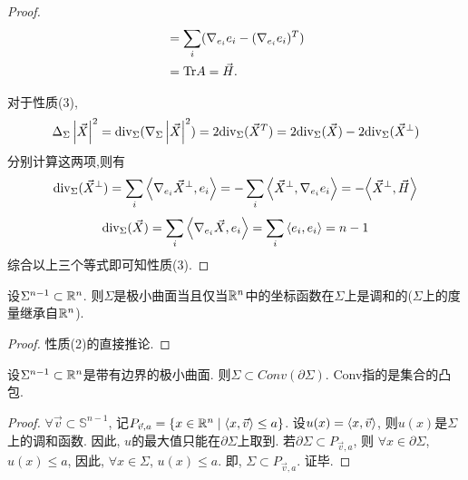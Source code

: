 \begin{proof}
\begin{equation}
\begin{split}
            &= \sum_i(\nabla_{e_i}e_i - (\nabla_{e_i}e_i)^T )\\
            &= \text{Tr} A = \vec{H}.
        \end{split}
    \end{equation}
    \par 对于性质(3),
    \begin{equation}
        \Delta_\Sigma\left | {\vec{X}} \right |^2={\text{div}}_\Sigma(\nabla_\Sigma\left | {\vec{X}} \right |^2) = 2{\text{div}}_\Sigma({\vec{X}}^T)=2{\text{div}}_\Sigma({\vec{X}})-2{\text{div}}_\Sigma({\vec{X}}^\perp)
    \end{equation}
    分别计算这两项,则有
    \begin{equation}
        \div_\Sigma(\XX^\perp)=\sum_i \inner{\nabla_{e_i}\XX^\perp}{e_i}=-\sum_i\inner{\XX^\perp}{\nabla_{e_i}e_i}=-\inner{\XX^\perp}{\vec{H}}%
    \end{equation}
    \begin{equation}
        {\text{div}}_\Sigma({\vec{X}})=\sum_i {\left < \nabla_{e_i}{\vec{X}}, e_i \right >}=\sum_i{\left < e_i, e_i \right >}=n-1
    \end{equation}
    综合以上三个等式即可知性质(3).
\end{proof}
\begin{corollary} \label{coordinate_h}
    设$\Sigma^{n-1}\subset \mathbb{R}^n$. 则$\Sigma$是极小曲面当且仅当$\mathbb{R}^n$中的坐标函数在$\Sigma$上是调和的($\Sigma$上的度量继承自$\mathbb{R}^n$).
\end{corollary}
\begin{proof}
    性质(2)的直接推论.
\end{proof}
\begin{corollary}
    设$\Sigma^{n-1}\subset \mathbb{R}^n$是带有边界的极小曲面. 则$\Sigma \subset Conv(\partial\Sigma)$. Conv指的是集合的凸包.
\end{corollary}
\begin{proof}
    $\forall \vec{v} \subset \mathbb{S}^{n-1}$, 记$P_{\vec{v},a}=\{x\in \mathbb{R}^n\mid {\left < x, \vec{v} \right >} \le a\}$. 设$u(x)={\left < x, \vec{v} \right >}$, 则$u(x)$是$\Sigma$上的调和函数. 因此, $u$的最大值只能在$\partial \Sigma$上取到. 若$\partial \Sigma \subset P_{\vec{v},a} $, 则 $\forall x \in \partial \Sigma$, $u(x) \le a$, 因此, $\forall x \in \Sigma$, $u(x) \le a$. 即, $\Sigma \subset P_{\vec{v},a}$. 证毕.
\end{proof}
